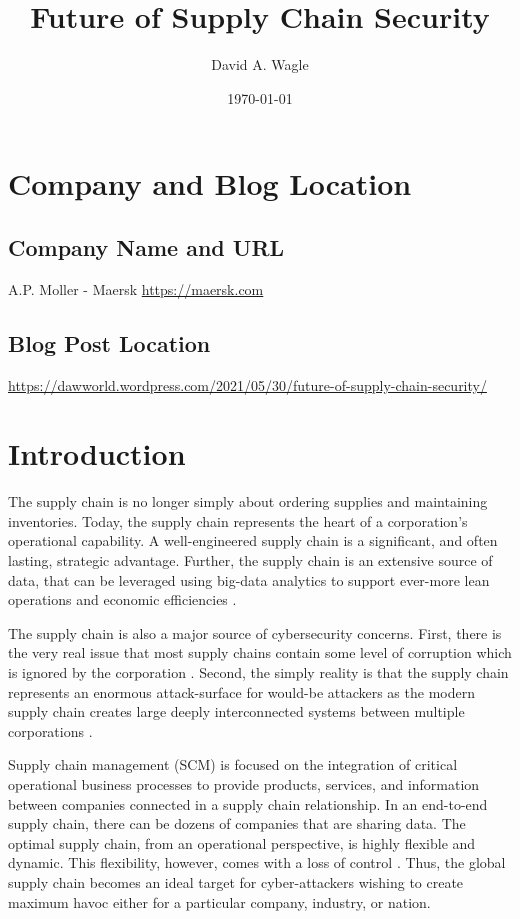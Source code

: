 \documentclass[floatsintext,stu]{apa7}
\affiliation{North Central University}
\author{David A. Wagle}
\date{\today}
\title{Future of Supply Chain Security}
\begin{document}
\maketitle


\section{Company and Blog Location}
\label{sec:org7ba9ef7}

\subsection{Company Name and URL}
\label{sec:orga69d0dc}

A.P. Moller - Maersk \url{https://maersk.com}

\subsection{Blog Post Location}
\label{sec:org785f5b5}

\url{https://dawworld.wordpress.com/2021/05/30/future-of-supply-chain-security/}

\newpage


\section{Introduction}
\label{sec:org8500567}

The supply chain is no longer simply about ordering supplies and maintaining inventories. Today, the supply chain represents the heart of a corporation's operational capability. A well-engineered supply chain is a significant, and often lasting, strategic advantage. Further, the supply chain is an extensive source of data, that can be leveraged using big-data analytics to support ever-more lean operations and economic efficiencies \cite{arunachalamUnderstandingBigData2018}.

The supply chain is also a major source of cybersecurity concerns. First, there is the very real issue that most supply chains contain some level of corruption which is ignored by the corporation \cite{webbTwoThirdsCorporationsIgnore2017}. Second, the simply reality is that the supply chain represents an enormous attack-surface for would-be attackers as the modern supply chain creates large deeply interconnected systems between multiple corporations \cite{govindanSupplyChainNetwork2017}.

Supply chain management (SCM) is focused on the integration of critical operational business processes to provide products, services, and information between companies connected in a supply chain relationship. In an end-to-end supply chain, there can be dozens of companies that are sharing data. The optimal supply chain, from an operational perspective, is highly flexible and dynamic. This flexibility, however, comes with a loss of control \cite{linawatiSupplyChainFlexibility2017}. Thus, the global supply chain becomes an ideal target for cyber-attackers wishing to create maximum havoc either for a particular company, industry, or nation.
\end{document}
